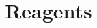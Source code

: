 \documentclass[preprint]{sigplanconf}
\begin{document}
\authorinfo{}{}{}
\title{Reagents}
\maketitle

\begin{abstract}
\end{abstract}


\end{document}
